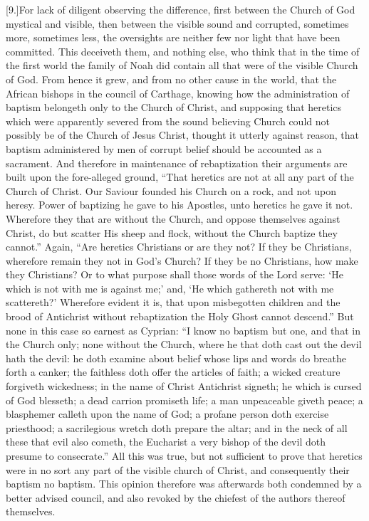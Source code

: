 [9.]For lack of diligent observing the difference, first between the Church of God mystical and visible, then between the visible sound and corrupted, sometimes more, sometimes less, the oversights are neither few nor light that have been committed. This deceiveth them, and nothing else, who think that in the time of the first world the family of Noah did contain all that were of the visible Church of God.  From hence it grew, and from no other cause in the world, that the African bishops in the council of Carthage, knowing how the administration of baptism belongeth only to the Church of Christ, and supposing that heretics which were apparently severed from the sound believing Church could not possibly be of the Church of Jesus Christ, thought it utterly against reason, that baptism administered by men of corrupt belief should be accounted as a sacrament. And therefore in maintenance of rebaptization their arguments are built upon the fore-alleged ground, “That heretics are not at all any part of the Church of Christ. Our Saviour founded his Church on a rock, and not upon heresy. Power of baptizing he gave to his Apostles, unto heretics he gave it not. Wherefore they that are without the Church, and oppose themselves against Christ, do but scatter His sheep and flock, without the Church baptize they cannot.” Again, “Are heretics Christians or are they not? If they be Christians, wherefore remain they not in God’s Church? If they be no Christians, how make they Christians? Or to what purpose shall those words of the Lord serve: ‘He which is not with me is against me;’ and, ‘He which gathereth not with me scattereth?’ Wherefore evident it is, that upon misbegotten children and the brood of Antichrist without rebaptization the Holy Ghost cannot descend.” But none in this case so earnest as Cyprian: “I know no baptism but one, and that in the  Church only; none without the Church, where he that doth cast out the devil hath the devil: he doth examine about belief whose lips and words do breathe forth a canker; the faithless doth offer the articles of faith; a wicked creature forgiveth wickedness; in the name of Christ Antichrist signeth; he which is cursed of God blesseth; a dead carrion promiseth life; a man unpeaceable giveth peace; a blasphemer calleth upon the name of God; a profane person doth exercise priesthood; a sacrilegious wretch doth prepare the altar; and in the neck of all these that evil also cometh, the Eucharist a very bishop of the devil doth presume to consecrate.” All this was true, but not sufficient to prove that heretics were in no sort any part of the visible church of Christ, and consequently their baptism no baptism. This opinion therefore was afterwards both condemned by a better advised council, and also revoked by the chiefest of the authors thereof themselves.

